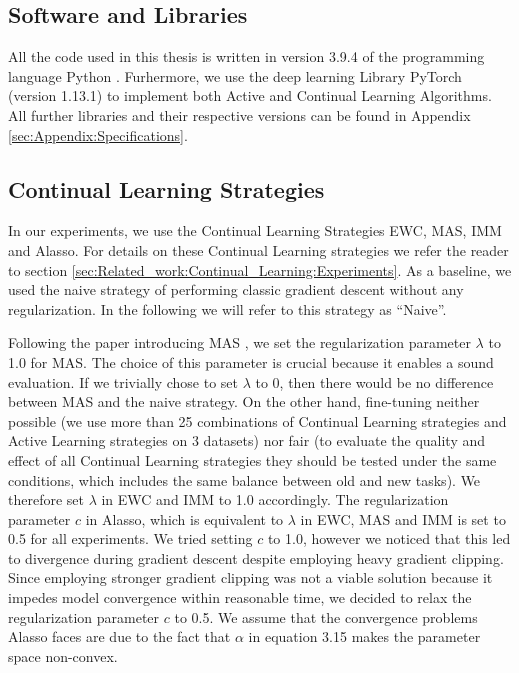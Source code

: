 \subsection{Software and Libraries}
\label{sec:ExperimentSetup:Software}
All the code used in this thesis is written in version 3.9.4 of the programming language Python \cite{Rossum1995Python}. Furhermore, we use the deep
learning Library PyTorch \cite{paszke2019pytorch} (version 1.13.1) to implement both Active and Continual Learning Algorithms. All further libraries
and their respective versions can be found in Appendix \ref{sec:Appendix:Specifications}.

\subsection{Continual Learning Strategies}
\label{sec:ExperimentSetup:CLStrategies}
In our experiments, we use the Continual Learning Strategies EWC, MAS, IMM and Alasso. For details on these Continual Learning strategies we refer
the reader to section \ref{sec:Related_work:Continual_Learning:Experiments}. As a baseline, we used the naive strategy of performing classic
gradient descent without any regularization. In the following we will refer to this strategy as \enquote{Naive}. \par
Following the paper introducing MAS \cite{aljundi2018memory}, we set the regularization parameter $\lambda$ to 1.0 for MAS. The choice of this parameter
is crucial because it enables a sound evaluation. If we trivially chose to set $\lambda$ to 0, then there would be no difference between MAS and the naive
strategy. On the other hand, fine-tuning neither possible (we use more than 25 combinations of Continual Learning strategies and Active Learning strategies 
on 3 datasets) nor fair (to evaluate the quality and effect of all Continual Learning strategies they should be tested under the same conditions, which
includes the same balance between old and new tasks). We therefore set $\lambda$ in EWC and IMM to 1.0 accordingly. The regularization parameter $c$ in
Alasso, which is equivalent to $\lambda$ in EWC, MAS and IMM is set to 0.5 for all experiments. We tried setting $c$ to 1.0, however we noticed that this
led to divergence during gradient descent despite employing heavy gradient clipping. Since employing stronger gradient clipping was not a viable solution
because it impedes model convergence within reasonable time, we decided to relax the regularization parameter $c$ to 0.5. We assume that the convergence 
problems Alasso faces are due to the fact that $\alpha$ in equation 3.15 makes the parameter space non-convex. \par
